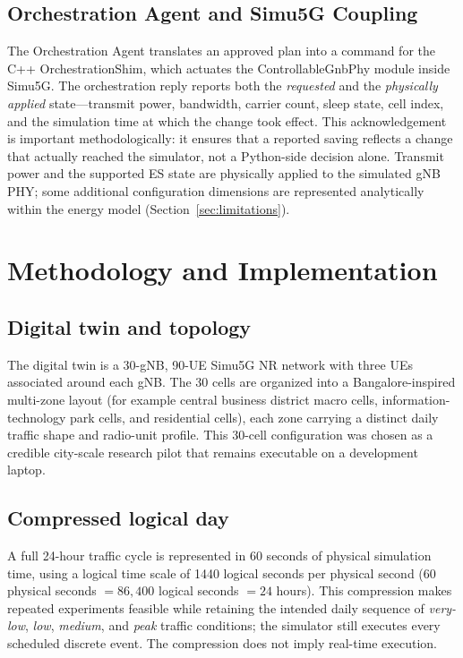 \documentclass[conference]{IEEEtran}
\begin{document}
\subsection{Orchestration Agent and Simu5G Coupling}
The Orchestration Agent translates an approved plan into a command for the C++ OrchestrationShim, which actuates the ControllableGnbPhy module inside Simu5G. The orchestration reply reports both the \emph{requested} and the \emph{physically applied} state---transmit power, bandwidth, carrier count, sleep state, cell index, and the simulation time at which the change took effect. This acknowledgement is important methodologically: it ensures that a reported saving reflects a change that actually reached the simulator, not a Python-side decision alone. Transmit power and the supported ES state are physically applied to the simulated gNB PHY; some additional configuration dimensions are represented analytically within the energy model (Section~\ref{sec:limitations}).

\section{Methodology and Implementation}
\subsection{Digital twin and topology}
The digital twin is a 30-gNB, 90-UE Simu5G NR network with three UEs associated around each gNB. The 30 cells are organized into a Bangalore-inspired multi-zone layout (for example central business district macro cells, information-technology park cells, and residential cells), each zone carrying a distinct daily traffic shape and radio-unit profile. This 30-cell configuration was chosen as a credible city-scale research pilot that remains executable on a development laptop.

\subsection{Compressed logical day}
A full 24-hour traffic cycle is represented in 60 seconds of physical simulation time, using a logical time scale of 1440 logical seconds per physical second ($60$ physical seconds $= 86{,}400$ logical seconds $= 24$ hours). This compression makes repeated experiments feasible while retaining the intended daily sequence of \emph{very-low}, \emph{low}, \emph{medium}, and \emph{peak} traffic conditions; the simulator still executes every scheduled discrete event. The compression does not imply real-time execution.
\end{document}
